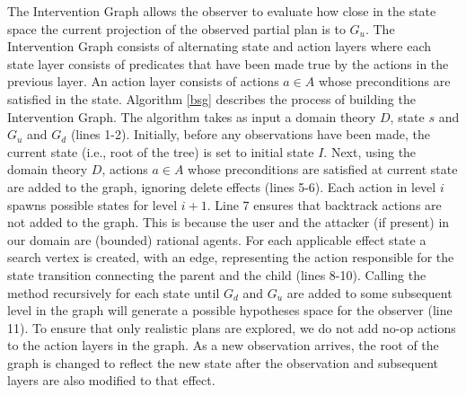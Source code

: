 \documentclass[letterpaper]{article}
\theoremstyle{plain}
\begin{document}
The Intervention Graph allows the observer to evaluate how close in the state space the current projection of the observed partial plan is to $G_u$. The Intervention Graph consists of alternating state and action layers where each state layer consists of predicates that have been made true by the actions in the previous layer. An action layer consists of actions $a\in A$ whose preconditions are satisfied in the state. Algorithm \ref{bsg} describes the process of building the Intervention Graph. The algorithm takes as input a domain theory $D$, state $s$ and $G_u$ and $G_d$ (lines 1-2). Initially, before any observations have been made, the current state (i.e., root of the tree) is set to initial state $I$. Next, using the domain theory $D$, actions  $a\in A$ whose preconditions are satisfied at current state are added to the graph, ignoring delete effects (lines 5-6). Each action in level $i$ spawns possible states for level $i+1$. Line 7 ensures that backtrack actions are not added to the graph. This is because the user and the attacker (if present) in our domain are (bounded) rational agents. For each applicable effect state a search vertex is created, with an edge, representing the action responsible for the state transition connecting the parent and the child (lines 8-10). Calling the method recursively for each state until $G_d$ and $G_u$ are added to some subsequent level in the graph will generate a possible hypotheses space for the observer (line 11). To ensure that only realistic plans are explored, we do not add no-op actions to the action layers in the graph. As a new observation arrives, the root of the graph is changed to reflect the new state after the observation and subsequent layers are also modified to that effect.  
\end{document}
